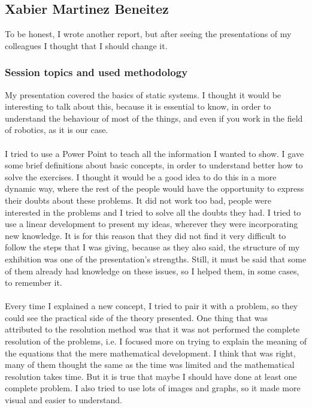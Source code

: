 \subsection{Xabier Martinez Beneitez}
To be honest, I wrote another report, but after seeing the presentations of my colleagues I thought that I should change it.
\subsubsection{Session topics and used methodology}
My presentation covered the basics of static systems. I thought it would be interesting to talk about this, because it is 
essential to know, in order to understand the behaviour of most of the things, and even if you work in the field of robotics, as it is our case.\\\\
I tried to use a Power Point to teach all the information I wanted to show. I gave some brief definitions about basic concepts, 
in order to understand better how to solve the exercises. I thought it would be a good idea to do this in a more dynamic way, 
where the rest of the people would have the opportunity to express their doubts about these problems. It did not work too bad, people were interested 
in the problems and I tried to solve all the doubts they had. I tried to use a linear development to present my ideas, wherever they were incorporating 
new knowledge. It is for this reason that they did not find it very difficult to follow the steps that I was giving, because as they also said, the structure
 of my exhibition was one of the presentation's strengths. Still, it must be said that some of them already had knowledge on these issues, so I helped them, in some 
cases, to remember it.\\\\
Every time I explained a new concept, I tried to pair it with a problem, so they could see the practical side of the theory presented. One thing that was 
attributed to the resolution method was that it was not performed the complete resolution of the problems, i.e. I focused more on trying to explain the meaning
of the equations that the mere mathematical development. I think that was right, many of them thought the same as the time was limited and the mathematical 
resolution takes time. But it is true that maybe I should have done at least one complete problem. I also tried to use lots of images and graphs, so it made 
more visual and easier to understand.\\\\
